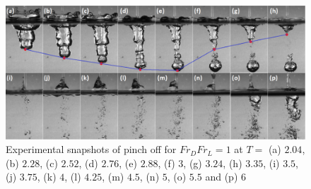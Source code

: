 \begin{figure}
	\centering
	\includegraphics[width=\linewidth]{chapters/jetPool/Figure10}
	\caption{Experimental snapshots of pinch off for $Fr_DFr_L = 1$  at $T = $ (a) $2.04$, (b) $2.28$, (c) $2.52$, (d) $2.76$, (e) $2.88$, (f) $3$, (g) $3.24$, (h) $3.35$, (i) $3.5$, (j) $3.75$, (k) $4$, (l) $4.25$, (m) $4.5$, (n) $5$, (o) $5.5$ and (p) $6$}
	\label{Figure::pinchex}
\end{figure}
